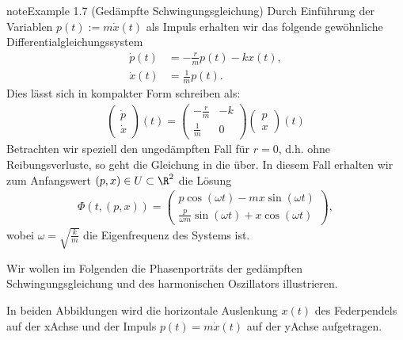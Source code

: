\documentclass[letterpaper,10pt,german]{jupyterBook}
\begin{document}
\begin{sphinxadmonition}{note}{Example 1.7 (Gedämpfte Schwingungsgleichung)}
\sphinxAtStartPar
Durch Einführung der Variablen \(p(t):= m\dot{x}(t)\) als Impuls erhalten wir das folgende gewöhnliche Differentialgleichungssystem
\begin{equation*}
\begin{split}\dot{p}(t) &= - \frac{r}{m}p(t) -kx(t), \\
\dot{x}(t) &= \frac{1}{m}p(t).\end{split}
\end{equation*}
\sphinxAtStartPar
Dies lässt sich in kompakter Form schreiben als:
\begin{equation*}
\begin{split}\begin{pmatrix} \dot{p} \\ \dot{x} \end{pmatrix}(t) = \begin{pmatrix} -\frac{r}{m} & -k \\ \frac{1}{m} & 0\end{pmatrix} \begin{pmatrix}p \\ x\end{pmatrix}(t)\end{split}
\end{equation*}
\sphinxAtStartPar
Betrachten wir speziell den ungedämpften Fall für \(r=0\), d.h. ohne Reibungsverluste, so geht die Gleichung in die  über.
In diesem Fall erhalten wir zum Anfangswert \((p,x) \in U \subset \R^2 \) die Lösung
\begin{equation*}
\begin{split}\Phi(t, (p,x)) = 
\begin{pmatrix}
p \cos(\omega t) - m x \sin(\omega t) \\
\frac{p}{\omega m}\sin(\omega t) + x\cos(\omega t)
\end{pmatrix},\end{split}
\end{equation*}
\sphinxAtStartPar
wobei \(\omega=\sqrt{\frac{k}{m}}\) die Eigenfrequenz des Systems ist.
\end{sphinxadmonition}

\sphinxAtStartPar
Wir wollen im Folgenden die Phasenporträts der gedämpften Schwingungsgleichung und des harmonischen Oszillators illustrieren.

\sphinxAtStartPar
In beiden Abbildungen wird die horizontale Auslenkung \(x(t)\) des Federpendels auf der x\sphinxhyphen{}Achse und der Impuls \(p(t) = m\dot{x}(t)\) auf der y\sphinxhyphen{}Achse aufgetragen.
\end{document}
